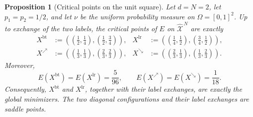 \documentclass[11pt]{article}
\def\Xc{{\mathcal X}}
\def\hX{\widehat{\Xc}^{\,N}}
\newtheorem{proposition}[theorem]{Proposition}
\theoremstyle{definition}
\theoremstyle{remark}
\numberwithin{equation}{section}
\begin{document}
\begin{proposition}[Critical points on the unit square]
\label{prop:square-critical-points}
Let $d=N=2$, let $p_1=p_2=1/2$, and let $\nu$ be the uniform probability measure on
$\Omega=[0,1]^2$.  Up to exchange of the two labels, the critical points of $E$ on $\hX$ are
exactly
\begin{align}
 X^{\mathrm{bt}}
 &:=\left(\left(\frac12,\frac14\right),
          \left(\frac12,\frac34\right)\right),
 &
 X^{\mathrm{lr}}
 &:=\left(\left(\frac14,\frac12\right),
          \left(\frac34,\frac12\right)\right),
 \label{eq:square-axis-critical-points}\\
 X^{\nearrow}
 &:=\left(\left(\frac13,\frac13\right),
          \left(\frac23,\frac23\right)\right),
 &
 X^{\searrow}
 &:=\left(\left(\frac23,\frac13\right),
          \left(\frac13,\frac23\right)\right).
 \label{eq:square-diagonal-critical-points}
\end{align}
Moreover,
\begin{equation}\label{eq:square-critical-energies}
 E(X^{\mathrm{bt}})=E(X^{\mathrm{lr}})=\frac{5}{96},
 \qquad
 E(X^{\nearrow})=E(X^{\searrow})=\frac1{18}.
\end{equation}
Consequently, $X^{\mathrm{bt}}$ and $X^{\mathrm{lr}}$, together with their label exchanges, are
exactly the global minimizers.  The two diagonal configurations and their label exchanges are
saddle points.
\end{proposition}
\end{document}
